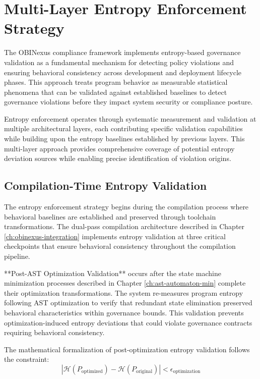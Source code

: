 \section{Multi-Layer Entropy Enforcement Strategy}

The OBINexus compliance framework implements entropy-based governance validation as a fundamental mechanism for detecting policy violations and ensuring behavioral consistency across development and deployment lifecycle phases. This approach treats program behavior as measurable statistical phenomena that can be validated against established baselines to detect governance violations before they impact system security or compliance posture.

Entropy enforcement operates through systematic measurement and validation at multiple architectural layers, each contributing specific validation capabilities while building upon the entropy baselines established by previous layers. This multi-layer approach provides comprehensive coverage of potential entropy deviation sources while enabling precise identification of violation origins.

\subsection{Compilation-Time Entropy Validation}

The entropy enforcement strategy begins during the compilation process where behavioral baselines are established and preserved through toolchain transformations. The dual-pass compilation architecture described in Chapter \ref{ch:obinexus-integration} implements entropy validation at three critical checkpoints that ensure behavioral consistency throughout the compilation pipeline.

**Post-AST Optimization Validation** occurs after the state machine minimization processes described in Chapter \ref{ch:ast-automaton-min} complete their optimization transformations. The system re-measures program entropy following AST optimization to verify that redundant state elimination preserved behavioral characteristics within governance bounds. This validation prevents optimization-induced entropy deviations that could violate governance contracts requiring behavioral consistency.

The mathematical formalization of post-optimization entropy validation follows the constraint:
\begin{equation}
|\mathcal{H}(P_{\text{optimized}}) - \mathcal{H}(P_{\text{original}})| < \epsilon_{\text{optimization}}
\end{equation}

